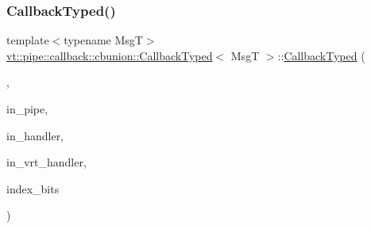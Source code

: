 \subsubsection{\texorpdfstring{Callback\+Typed()}{CallbackTyped()}\hspace{0.1cm}{\footnotesize\ttfamily [10/14]}}
{\footnotesize\ttfamily template$<$typename MsgT$>$ \\
\hyperlink{structvt_1_1pipe_1_1callback_1_1cbunion_1_1_callback_typed}{vt\+::pipe\+::callback\+::cbunion\+::\+Callback\+Typed}$<$ MsgT $>$\+::\hyperlink{structvt_1_1pipe_1_1callback_1_1cbunion_1_1_callback_typed}{Callback\+Typed} (\begin{DoxyParamCaption}\item[{Raw\+Send\+Col\+Dir\+Tag\+Type}]{,  }\item[{\hyperlink{namespacevt_ac9852acda74d1896f48f406cd72c7bd3}{Pipe\+Type} const \&}]{in\+\_\+pipe,  }\item[{\hyperlink{namespacevt_af64846b57dfcaf104da3ef6967917573}{Handler\+Type} const}]{in\+\_\+handler,  }\item[{\hyperlink{structvt_1_1pipe_1_1callback_1_1cbunion_1_1_callback_raw_base_single_a734a9c83099de5bc1cd85f9da8dba7bb}{Auto\+Handler\+Type} const}]{in\+\_\+vrt\+\_\+handler,  }\item[{void $\ast$}]{index\+\_\+bits }\end{DoxyParamCaption})\hspace{0.3cm}{\ttfamily [inline]}}

\mbox{\label{structvt_1_1pipe_1_1callback_1_1cbunion_1_1_callback_typed_a0be373f1ebb6916b873f329d82dd76ce}} 
